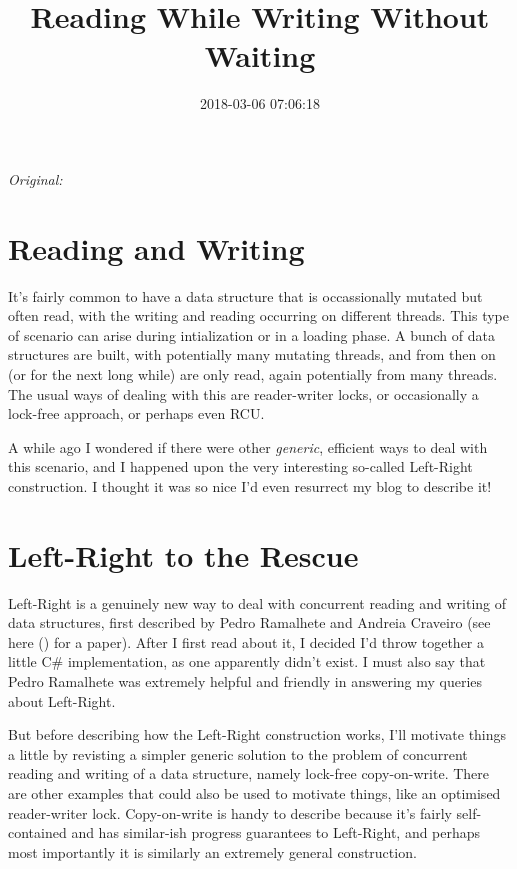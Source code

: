 \documentclass[11pt]{article}
\begin{document}
\title{Reading While Writing Without Waiting}
\date{2018-03-06 07:06:18}
\maketitle

\noindent\textit{Original: }\texttt{}\par
\medskip
\section{Reading and Writing}

It's fairly common to have a data structure that is occassionally mutated but often read, with the writing and reading occurring on different threads. This type of scenario can arise during intialization or in a loading phase. A bunch of data structures are built, with potentially many mutating threads, and from then on (or for the next long while) are only read, again potentially from many threads. The usual ways of dealing with this are reader-writer locks, or occasionally a lock-free approach, or perhaps even RCU.
 
A while ago I wondered if there were other \emph{generic}, efficient ways to deal with this scenario, and I happened upon the very interesting so-called Left-Right construction. I thought it was so nice I'd even resurrect my blog to describe it! 

\section{Left-Right to the Rescue}

Left-Right is a genuinely new way to deal with concurrent reading and writing of data structures, first described by Pedro Ramalhete and Andreia Craveiro (see here (\texttt{}) for a paper). After I first read about it, I decided I'd throw together a little C\# implementation, as one apparently didn't exist. I must also say that Pedro Ramalhete was extremely helpful and friendly in answering my queries about Left-Right.

But before describing how the Left-Right construction works, I'll motivate things a little by revisting a simpler generic solution to the problem of concurrent reading and writing of a data structure, namely lock-free copy-on-write. There are other examples that could also be used to motivate things, like an optimised reader-writer lock. Copy-on-write is handy to describe because it's fairly self-contained and has similar-ish progress guarantees to Left-Right, and perhaps most importantly it is similarly an extremely general construction.
\end{document}
